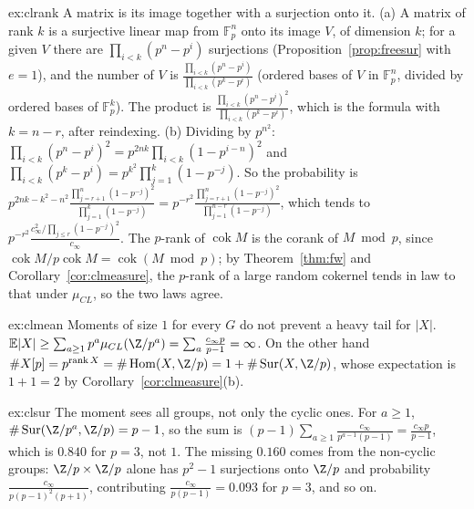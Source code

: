 \begin{solution}{ex:clrank}
\idea A matrix is its image together with a surjection onto it.
\writeup (a) A matrix of rank $k$ is a surjective linear map from $\mathbb F_p^n$ onto its image $V$, of dimension $k$; for a given $V$ there are $\prod_{i<k}(p^n-p^i)$ surjections (Proposition~\ref{prop:freesur} with $e=1$), and the number of $V$ is $\frac{\prod_{i<k}(p^n-p^i)}{\prod_{i<k}(p^k-p^i)}$ (ordered bases of $V$ in $\mathbb F_p^n$, divided by ordered bases of $\mathbb F_p^k$). The product is $\frac{\prod_{i<k}(p^n-p^i)^2}{\prod_{i<k}(p^k-p^i)}$, which is the formula with $k=n-r$, after reindexing. (b) Dividing by $p^{n^2}$: $\prod_{i<k}(p^n-p^i)^2=p^{2nk}\prod_{i<k}(1-p^{i-n})^2$ and $\prod_{i<k}(p^k-p^i)=p^{k^2}\prod_{j=1}^k(1-p^{-j})$. So the probability is $p^{2nk-k^2-n^2}\frac{\prod_{j=r+1}^n(1-p^{-j})^2}{\prod_{j=1}^k(1-p^{-j})}=p^{-r^2}\frac{\prod_{j=r+1}^n(1-p^{-j})^2}{\prod_{j=1}^{n-r}(1-p^{-j})}$, which tends to $p^{-r^2}\frac{c_\infty^2/\prod_{j\le r}(1-p^{-j})^2}{c_\infty}$. The $p$-rank of $\operatorname{cok}M$ is the corank of $M\bmod p$, since $\operatorname{cok}M/p\operatorname{cok}M=\operatorname{cok}(M\bmod p)$; by Theorem~\ref{thm:fw} and Corollary~\ref{cor:clmeasure}, the $p$-rank of a large random cokernel tends in law to that under $\mu_{CL}$, so the two laws agree.
\end{solution}

\begin{solution}{ex:clmean}
\idea Moments of size $1$ for every $G$ do not prevent a heavy tail for $|X|$.
\writeup $\mathbb E|X|\ge\sum_{a\ge1}p^a\mu_{CL}(\Z/p^a)=\sum_a\frac{c_\infty p}{p-1}=\infty$. On the other hand $\#X[p]=p^{\operatorname{rank}X}=\#\operatorname{Hom}(X,\Z/p)=1+\#\operatorname{Sur}(X,\Z/p)$, whose expectation is $1+1=2$ by Corollary~\ref{cor:clmeasure}(b).
\end{solution}

\begin{solution}{ex:clsur}
\idea The moment sees all groups, not only the cyclic ones.
\writeup For $a\ge1$, $\#\operatorname{Sur}(\Z/p^a,\Z/p)=p-1$, so the sum is $(p-1)\sum_{a\ge1}\frac{c_\infty}{p^{a-1}(p-1)}=\frac{c_\infty p}{p-1}$, which is $0.840$ for $p=3$, not $1$. The missing $0.160$ comes from the non-cyclic groups: $\Z/p\times\Z/p$ alone has $p^2-1$ surjections onto $\Z/p$ and probability $\frac{c_\infty}{p(p-1)^2(p+1)}$, contributing $\frac{c_\infty}{p(p-1)}=0.093$ for $p=3$, and so on.
\end{solution}

